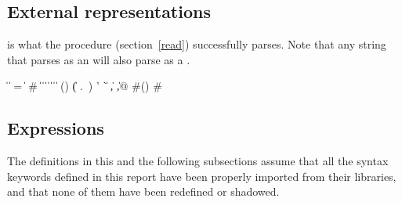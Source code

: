 \subsection{External representations}
\label{datumsyntax}

 is what the  procedure (section~\ref{read})
successfully parses.  Note that any string that parses as an
 will also parse as a .  \label{datum}

\begin{grammar}%
 \:  \| 
\>  \|  =  \|  \#
 \:  \| 
\>  \|  \|  \|   \| 
 \: 
 \:  \|  \| 
 \: () \| ( .\ )
 \:  
 \: ' \| ` \| , \| ,@
 \: \#()
 \: \#  %
\end{grammar}


\subsection{Expressions}

The definitions in this and the following subsections assume that all
the syntax keywords defined in this report have been properly imported
from their libraries, and that none of them have been redefined or shadowed.

